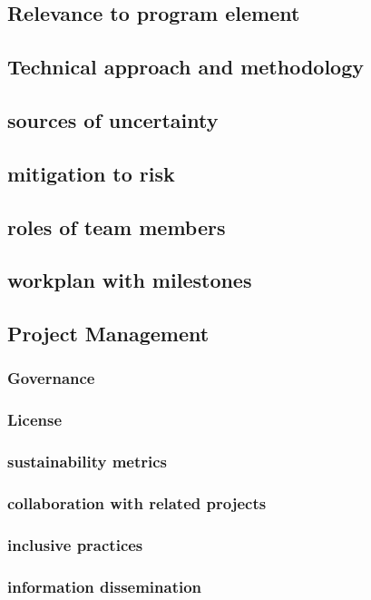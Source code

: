\documentclass[12pt]{article}
\numberwithin{page}{section}
\begin{document}
\subsection{Relevance to program element}
\subsection{Technical approach and methodology}
\subsection{sources of uncertainty}
\subsection{mitigation to risk}
\subsection{roles of team members}
\subsection{workplan with milestones}

\subsection{Project Management}
\subsubsection{Governance}
\subsubsection{License}
\subsubsection{sustainability metrics}
\subsubsection{collaboration with related projects}
\subsubsection{inclusive practices}
\subsubsection{information dissemination}
\end{document}
